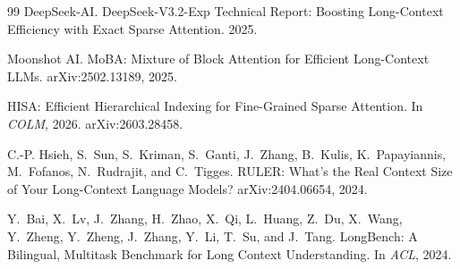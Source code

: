 \documentclass[11pt]{article}
\begin{document}
\begin{thebibliography}{99}
DeepSeek-AI. DeepSeek-V3.2-Exp Technical Report: Boosting Long-Context Efficiency with Exact Sparse Attention. 2025.

Moonshot AI. MoBA: Mixture of Block Attention for Efficient Long-Context LLMs. arXiv:2502.13189, 2025.

HISA: Efficient Hierarchical Indexing for Fine-Grained Sparse Attention. In \emph{COLM}, 2026. arXiv:2603.28458.

C.-P. Hsieh, S.~Sun, S.~Kriman, S.~Ganti, J.~Zhang, B.~Kulis, K.~Papayiannis, M.~Fofanos, N.~Rudrajit, and C.~Tigges. RULER: What's the Real Context Size of Your Long-Context Language Models? arXiv:2404.06654, 2024.

Y.~Bai, X.~Lv, J.~Zhang, H.~Zhao, X.~Qi, L.~Huang, Z.~Du, X.~Wang, Y.~Zheng, Y.~Zheng, J.~Zhang, Y.~Li, T.~Su, and J.~Tang. LongBench: A Bilingual, Multitask Benchmark for Long Context Understanding. In \emph{ACL}, 2024.

\end{thebibliography}
\end{document}

